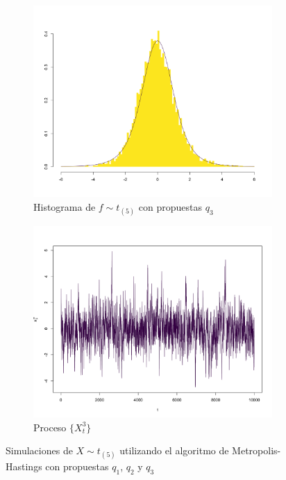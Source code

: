 \documentclass[11pt,a4paper]{article}
\begin{document}
\begin{figure}[!p]
     \vspace{0.2cm}
    
    \begin{subfigure}[t]{0.45\textwidth}
        \centering
        \includegraphics[width=\linewidth]{mh_hist_x3.png} 
        \caption{Histograma de $f \sim t_{(5)}$ con propuestas $q_3$} \label{fig:mh_hist_x3}
    \end{subfigure}
    \hfill
    \begin{subfigure}[t]{0.45\textwidth}
        \centering
        \includegraphics[width=\linewidth]{mh_chain_x3.png} 
        \caption{Proceso $\lbrace X_t^3 \rbrace$} \label{fig:mh_chain_x3}
    \end{subfigure}
    
    \caption{Simulaciones de $X \sim t_{(5)}$ utilizando el algoritmo de Metropolis-Hastings con propuestas $q_1$, $q_2$ y $q_3$}
    \label{fig:mh_t}
\end{figure}
\end{document}
